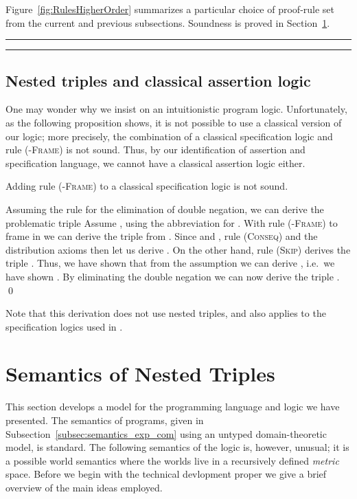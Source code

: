 \documentclass{LMCS}
\theoremstyle{remark}
\begin{document}
  
 Figure~\ref{fig:RulesHigherOrder}  summarizes a particular choice of
  proof-rule set from the current and previous subsections.  
Soundness is proved  in Section~\ref{sec:Semantics}.

\begin{figure*}[!t]
\hrule

\hrule
\caption{Proof rules specific to higher-order store}
\label{fig:RulesHigherOrder}
\end{figure*}


\subsection{Nested triples and classical assertion logic}
\label{subsec:ClassicalAssertionLogic}
One may wonder why we insist on an intuitionistic program logic. 
Unfortunately, as the following proposition shows, it is not possible to use a classical version of our logic; more precisely, the combination of a classical specification logic and   rule (\textsc{-Frame}) is not sound. Thus, by our identification of assertion and specification language, we cannot have a classical assertion logic either. 

\begin{prop}
\label{prop:classicalUnsound}
Adding rule  (\textsc{-Frame})  to a classical specification logic is not sound.
\end{prop}
\proof
Assuming the rule for the elimination of double negation, 
we can derive the   problematic triple 
Assume ,
using the abbreviation  for . With   rule (\textsc{-Frame}) to frame in  we can derive the triple 
 from . 
Since  and , rule (\textsc{Conseq}) and the distribution axioms then let us derive  . On the other hand, rule (\textsc{Skip}) derives  the triple .
 Thus, we have shown that from the assumption   we can derive , i.e.\ we have shown  
. 
By eliminating the double negation we can now derive the triple . \qed


Note that this derivation does not use nested triples, and also applies to the specification logics used in \cite{BirkedalL:semslt-lmcs,Birkedal:Reus:Schwinghammer:Yang:08}.

 
\section{Semantics of Nested Triples}
\label{sec:Semantics}


This section develops a model for the programming language and logic we have presented. 
The semantics of programs, given in Subsection~\ref{subsec:semantics_exp_com} using an untyped domain-theoretic model, is standard. 
The following semantics of the logic is, however, unusual; it
is a possible world semantics where the worlds live in a  recursively defined {\em metric\/} space. 
Before we begin with the technical devlopment proper we give a brief overview of the main ideas employed.
\end{document}
